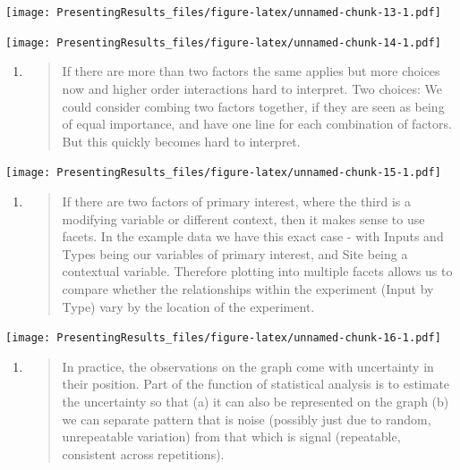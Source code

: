 \documentclass[
  titlepage]{book}
\begin{document}
\texttt{[image: PresentingResults\_files/figure-latex/unnamed-chunk-13-1.pdf]}

\texttt{[image: PresentingResults\_files/figure-latex/unnamed-chunk-14-1.pdf]}

\begin{enumerate}
\def\labelenumi{\arabic{enumi}.}
\setcounter{enumi}{4}
\item
  \begin{quote}
  If there are more than two factors the same applies but more choices now and higher order interactions hard to interpret. Two choices:
  We could consider combing two factors together, if they are seen as being of equal importance, and have one line for each combination of factors. But this quickly becomes hard to interpret.
  \end{quote}
\end{enumerate}

\texttt{[image: PresentingResults\_files/figure-latex/unnamed-chunk-15-1.pdf]}

\begin{enumerate}
\def\labelenumi{\arabic{enumi}.}
\setcounter{enumi}{5}
\item
  \begin{quote}
  If there are two factors of primary interest, where the third is a modifying variable or different context, then it makes sense to use facets. In the example data we have this exact case - with Inputs and Types being our variables of primary interest, and Site being a contextual variable. Therefore plotting into multiple facets allows us to compare whether the relationships within the experiment (Input by Type) vary by the location of the experiment.
  \end{quote}
\end{enumerate}

\texttt{[image: PresentingResults\_files/figure-latex/unnamed-chunk-16-1.pdf]}

\begin{enumerate}
\def\labelenumi{\arabic{enumi}.}
\setcounter{enumi}{6}
\item
  \begin{quote}
  In practice, the observations on the graph come with uncertainty in their position. Part of the function of statistical analysis is to estimate the uncertainty so that (a) it can also be represented on the graph (b) we can separate pattern that is noise (possibly just due to random, unrepeatable variation) from that which is signal (repeatable, consistent across repetitions).
  \end{quote}
\end{enumerate}
\end{document}
